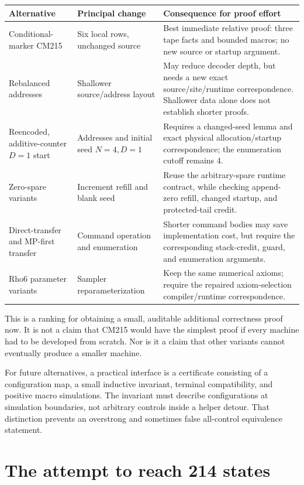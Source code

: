 \documentclass[11pt,letterpaper]{article}
\theoremstyle{definition}\newtheorem{definition}[theorem]{Definition}
\theoremstyle{remark}\newtheorem{remark}[theorem]{Remark}
\begin{document}
\begin{longtable}{@{}>{\raggedright\arraybackslash}p{}>{\raggedright\arraybackslash}p{}>{\raggedright\arraybackslash}p{}@{}}
\toprule
Alternative & Principal change & Consequence for proof effort\\\midrule
\endhead
Conditional-marker CM215 & Six local rows, unchanged source & Best immediate relative proof: three tape facts and bounded macros; no new source or startup argument.\\
Rebalanced addresses & Shallower source/address layout & May reduce decoder depth, but needs a new exact source/site/runtime correspondence. Shallower data alone does not establish shorter proofs.\\
Reencoded, additive-counter $D=1$ start & Addresses and initial seed $N=4,D=1$ & Requires a changed-seed lemma and exact physical allocation/startup correspondence; the enumeration cutoff remains 4.\\
Zero-spare variants & Increment refill and blank seed & Reuse the arbitrary-spare runtime contract, while checking append-zero refill, changed startup, and protected-tail credit.\\
Direct-transfer and MP-first transfer & Command operation and enumeration & Shorter command bodies may save implementation cost, but require the corresponding stack-credit, guard, and enumeration arguments.\\
Rho6 parameter variants & Sampler reparameterization & Keep the same numerical axioms; require the repaired axiom-selection compiler/runtime correspondence.\\
\bottomrule
\end{longtable}

This is a ranking for obtaining a small, auditable additional correctness
proof now. It is not a claim that CM215 would have the simplest proof if
every machine had to be developed from scratch. Nor is it a claim that
other variants cannot eventually produce a smaller machine.

For future alternatives, a practical interface is a certificate consisting
of a configuration map, a small inductive invariant, terminal compatibility,
and positive macro simulations. The invariant must describe configurations
at simulation boundaries, not arbitrary controls inside a helper detour.
That distinction prevents an overstrong and sometimes false all-control
equivalence statement.

\section{The attempt to reach 214 states}
\label{sec:search}
\end{document}
